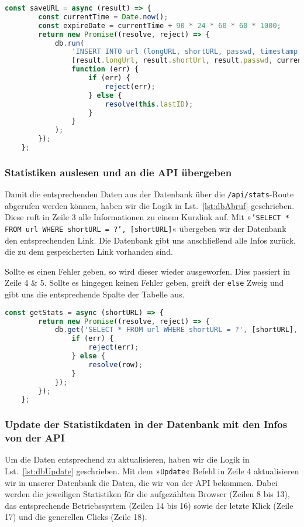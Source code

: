 \documentclass[a4paper,11pt,DIV=12,overfullrule=on]{scrreprt}%
\begin{document}
\begin{lstlisting}[language=JavaScript,
    caption={Speichern der URL in der Datenbank},
    label={lst:dbSave},
    float=h,
    gobble=4
]
    const saveURL = async (result) => {
        const currentTime = Date.now();
        const expireDate = currentTime + 90 * 24 * 60 * 60 * 1000; 
        return new Promise((resolve, reject) => {
            db.run(
                'INSERT INTO url (longURL, shortURL, passwd, timestamp, expireDate) VALUES (?, ?, ?, ?, ?)',
                [result.longUrl, result.shortUrl, result.passwd, currentTime, expireDate],
                function (err) {
                    if (err) {
                        reject(err);
                    } else {
                        resolve(this.lastID);
                    }
                }
            );
        });
    };
\end{lstlisting}

\subsubsection{Statistiken auslesen und an die API übergeben}
Damit die entsprechenden Daten aus der Datenbank über die \texttt{/api/stats}-Route abgerufen werden können, haben wir die Logik in Lst.~\ref{lst:dbAbruf} geschrieben. 
Diese ruft in Zeile 3 alle Informationen zu einem Kurzlink auf. Mit »\texttt{'SELECT * FROM url WHERE shortURL = ?', [shortURL]}« übergeben wir der Datenbank den entsprechenden Link. Die Datenbank gibt uns anschließend alle Infos zurück, die zu dem gespeicherten Link vorhanden sind. 

Sollte es einen Fehler geben, so wird dieser wieder ausgeworfen. Dies passiert in Zeile 4 \& 5. Sollte es hingegen keinen Fehler geben, greift der \texttt{else} Zweig und gibt uns die entsprechende Spalte der Tabelle aus. 

\begin{lstlisting}[language=JavaScript,
    caption={Daten werden von der Datenbank anhand des Kurzlinks abgerufen},
    label={lst:dbAbruf},
    float=h,
    gobble=4
]
    const getStats = async (shortURL) => {
        return new Promise((resolve, reject) => {
            db.get('SELECT * FROM url WHERE shortURL = ?', [shortURL], (err, row) => {
                if (err) {
                    reject(err);
                } else {
                    resolve(row);
                }
            });
        });
    };
\end{lstlisting}

\subsubsection{Update der Statistikdaten in der Datenbank mit den Infos von der API}
Um die Daten entsprechend zu aktualisieren, haben wir die Logik in Lst.~\ref{lst:dbUpdate} geschrieben. Mit dem »\texttt{Update}« Befehl in Zeile 4 aktualisieren wir in unserer Datenbank die Daten, die wir von der API bekommen. Dabei werden die jeweiligen Statistiken für die aufgezählten Browser (Zeilen 8 bis 13), das entsprechende Betriebssystem (Zeilen 14 bis 16) sowie der letzte Klick (Zeile 17) und die generellen Clicks (Zeile 18).
\end{document}
